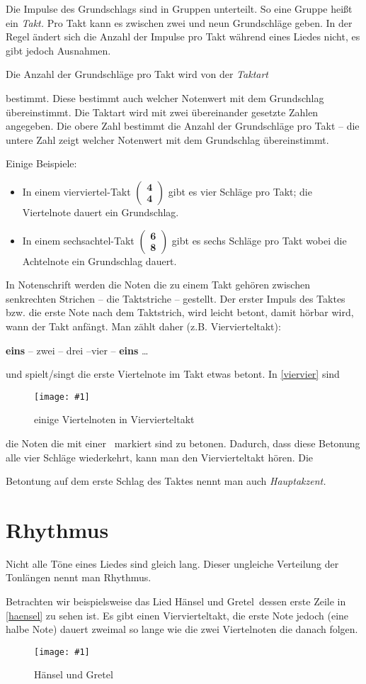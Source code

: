 \documentclass[10pt,a4paper,twoside]{report}
\newcommand{\comment}[1]{
	\marginpar{
		\textsf{#1}
	}
}
\newcommand{\image}[4]{
	\begin{figure}[!ht]
		\centering
		\texttt{[image: \#1]}
		\caption{#2}
		\label{#3}
	\end{figure}
}
\begin{document}
Die Impulse des Grundschlags sind in Gruppen unterteilt. So eine Gruppe heißt 
ein \emph{Takt.}\comment{Takt}Pro Takt kann es zwischen zwei und neun
Grundschläge geben. 
In der Regel ändert sich die Anzahl der Impulse pro Takt während eines
Liedes nicht, es gibt jedoch Ausnahmen. 


Die Anzahl der Grundschläge pro Takt wird von der \emph{Taktart}%
\comment{Taktart}bestimmt. Diese bestimmt auch welcher Notenwert
mit dem Grundschlag übereinstimmt. Die Taktart wird mit zwei 
übereinander gesetzte Zahlen angegeben. Die obere Zahl bestimmt die Anzahl
der Grundschläge pro Takt -- die untere Zahl zeigt welcher Notenwert mit dem
Grundschlag übereinstimmt.


Einige Beispiele:
\parskip 0pt
\begin{itemize}
\item In einem vierviertel-Takt $ \left( \begin{array}{c}\textbf{4} \\ \textbf{4} \end{array}\right)  $
gibt es vier Schläge pro Takt; die Viertelnote dauert ein Grundschlag.
\item In einem sechsachtel-Takt $ \left( \begin{array}{c}\textbf{6} \\ \textbf{8} \end{array}\right)  $
gibt es sechs Schläge pro Takt wobei die Achtelnote ein Grundschlag dauert.
\end{itemize}
\parskip 3pt

In Notenschrift werden die Noten die zu einem Takt gehören zwischen senkrechten 
Strichen
-- die Taktstriche -- gestellt.
Der erster Impuls des Taktes bzw. die erste Note nach dem Taktstrich, wird
leicht betont, damit hörbar wird, wann der Takt anfängt. Man zählt daher (z.B. 
Viervierteltakt):

\hspace{2cm}\textbf{eins} -- zwei -- drei --vier -- \textbf{eins} \dots

und spielt/singt die erste Viertelnote im Takt etwas betont. In 
\autoref{viervier}
sind
\image{lilypond/viervier.png}{einige Viertelnoten in Viervierteltakt}{viervier}{6}
die Noten die mit einer \grqq\ markiert sind zu betonen. Dadurch, dass diese
Betonung alle vier Schläge wiederkehrt, kann man den Viervierteltakt hören. Die  
\comment{Hauptakzent} 
Betontung auf dem erste Schlag des Taktes nennt man auch \emph{Hauptakzent.}

\section{Rhythmus}
Nicht alle Töne eines Liedes sind gleich lang. Dieser ungleiche Verteilung der 
Tonlängen nennt man Rhythmus.\comment{Rhythmus}
Betrachten wir beispielsweise das Lied \glqq Hänsel
und Gretel\grqq\ dessen erste Zeile in \autoref{haensel} zu sehen ist. %
Es gibt einen Viervierteltakt,
die erste Note jedoch (eine halbe Note) dauert zweimal so lange wie die zwei
Viertelnoten die danach folgen. 
\image{lilypond/haensel.png}{Hänsel und Gretel}{haensel}{10}%
\end{document}
